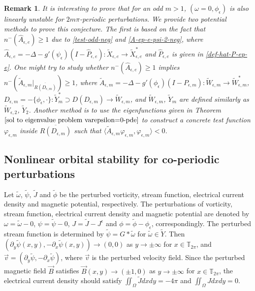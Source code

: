 \documentclass[1 [leqno, 11pt]{amsart}
\numberwithin{equation}{section}
\let\ep=\epsilon
\newtheorem{Theorem}{Theorem}[section]
\newtheorem{Remark}[Theorem]{Remark}
\begin{document}
\begin{CJK*}{GBK}{song}
\begin{Remark}\label{linear instability for odd periodic perturbations}
It is interesting  to prove that for an odd  $m>1$,  $(\omega=0,\phi_{\ep})$ is also linearly unstable for $2m\pi$-periodic perturbations.
We provide two potential methods to prove this conjecture. The first is based on the fact that $n^-\left(\hat{A}_{\ep,e}\right)\geq1$ due to \eqref{test-odd-neg} and \eqref{A-ep-e-psi-2-neg}, where
$\hat{A}_{\ep,e} = -\Delta - g'(\psi_\ep)(I-\hat P_{\ep,e}) : \tilde{X}_{\ep, e} \rightarrow \tilde{X}_{\ep, e}^*$ and $\hat P_{\ep,e}$  is given in \eqref{def-hat-P-ep-e}. One might try to study whether  $n^-\left(\hat{A}_{\ep,e}\right)\geq1$ implies $n^-\left(\tilde A_{\ep,m}|_{\overline{R(D_{\ep,m})}}\right)\geq1$, where $\tilde A_{\ep,m}=-\Delta-g'(\phi_{\ep})(I-P_{\ep,m}):\tilde W_{\ep,m}\to\tilde W_{\ep,m}^*$, $D_{\ep,m}=-\{\phi_{\ep},\cdot\}:\tilde Y_m^*\supset D(D_{\ep,m})\to\tilde W_{\ep,m}$, and $\tilde W_{\ep,m}$, $\tilde Y_m$ are defined similarly as $\tilde W_{\ep,2}$, $\tilde Y_2$. Another method is to use the eigenfunctions given in Theorem $\ref{sol to eigenvalue problem varepsilon=0-pde}$ to
 construct a concrete test function $\varphi_{\ep,m}$ inside $\overline{R(D_{\ep,m})}$ such that $\langle \tilde A_{\ep,m}\varphi_{\ep,m},\varphi_{\ep,m}\rangle<0$.
\end{Remark}
\subsection{Nonlinear orbital stability   for co-periodic perturbations}
Let $\tilde \omega$, $\tilde \psi$, $\tilde J$ and $\tilde \phi$ be  the perturbed vorticity, stream function, electrical current density and  magnetic potential, respectively. The perturbations of vorticity, stream function, electrical current density and magnetic potential are denoted by $\omega=\tilde \omega-0$,  $\psi=\tilde \psi-0$,
 $J=\tilde J-J^\ep$ and $\phi=\tilde \phi-\phi_\ep$, correspondingly. The perturbed stream function is determined by $
\tilde \psi=G*\tilde \omega$ for $\tilde \omega\in\tilde Y$.
Then $(\partial_y\tilde \psi(x,y),-\partial_x\tilde \psi(x,y))\to (0,0)$ as $y\to\pm\infty$ for $x\in\mathbb{T}_{2\pi}$, and $\vec{v}=(\partial_y\tilde \psi,-\partial_x\tilde \psi)$, where $\vec{v}$ is  the perturbed velocity field.
Since
 the perturbed magnetic field $\vec{B}$  satisfies $\vec{B}(x,y)\to(\pm1,0)$ as $y\to \pm\infty$ for $x\in\mathbb{T}_{2\pi}$, the electrical current density should satisfy $\iint_\Omega \tilde J dxdy=-4\pi$ and $\iint_\Omega  J dxdy=0$.


\end{CJK*}
\end{document}

